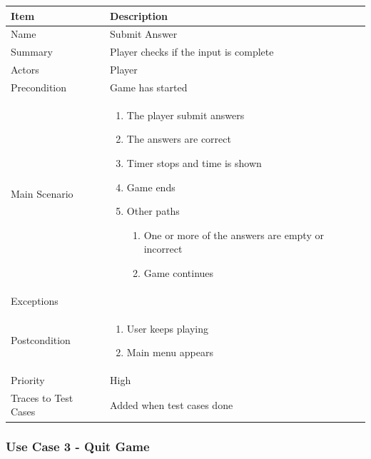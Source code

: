 \documentclass[12pt]{article}
\begin{document}
\begin{center}
\setlength{\tabcolsep}{16pt}
\renewcommand{\arraystretch}{1.1}
\begin{tabular}{ |p{3cm}|p{10cm}| }
    \hline
    \rowcolor{green}
   Item & Description \\
    \hline
    Name & Submit Answer \\
    \hline
    Summary & Player checks if the input is complete \\
    \hline
    Actors & Player \\
    \hline
    Precondition & Game has started \\
    \hline
    Main Scenario &     
    \vspace*{-0.1in}
    \begin{enumerate}
    \item The player submit answers
    \item The answers are correct
    \item Timer stops and time is shown
    \item Game ends
    \item Other paths
        \begin{enumerate}
            \item One or more of the answers are empty or incorrect
            \item Game continues
        \end{enumerate}
    \end{enumerate}  \\
    \hline
    Exceptions &  \\
    \hline
    Postcondition & 
    \vspace*{-0.2in}
    \begin{enumerate}
    \item User keeps playing
    \item Main menu appears
    \end{enumerate}  \\
    \hline
    Priority & High  \\
    \hline
    Traces to Test Cases & Added when test cases done  \\
    \hline
\end{tabular}
\end{center}

\newpage


\subsubsection{Use Case 3 - Quit Game} \label{uc:3}
\end{document}
